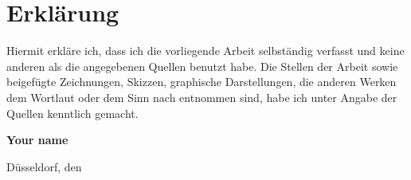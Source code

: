 \newpage

\section{Erklärung}

Hiermit erkläre ich, dass ich die vorliegende Arbeit 
selbständig verfasst und keine anderen als die angegebenen Quellen benutzt habe. 
Die Stellen der Arbeit sowie beigefügte Zeichnungen, Skizzen, graphische Darstellungen, die anderen Werken dem Wortlaut oder dem Sinn nach entnommen sind, habe ich unter Angabe der Quellen kenntlich gemacht.

\vspace{1cm}

\textbf{Your name}

\vspace{.5cm}

\noindent Düsseldorf, den 
